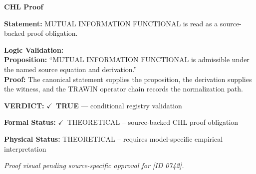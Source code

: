 \vspace{0.45em}
\noindent\textbf{CHL Proof}\par
\textbf{Statement:} MUTUAL INFORMATION FUNCTIONAL is read as a source-backed proof obligation.

\textbf{Logic Validation:}\\
\textbf{Proposition:} ``MUTUAL INFORMATION FUNCTIONAL is admissible under the named source equation and derivation.''\\
\textbf{Proof:} The canonical statement supplies the proposition, the derivation supplies the witness, and the TRAWIN operator chain records the normalization path.

\textbf{VERDICT:} \ensuremath{\checkmark}\ \textbf{TRUE} --- conditional registry validation

\textbf{Formal Status:} \ensuremath{\checkmark}\ THEORETICAL -- source-backed CHL proof obligation

\textbf{Physical Status:} THEORETICAL -- requires model-specific empirical interpretation
\par\vspace{0.45em}
\par
\vfill
\begingroup\footnotesize\itshape
Proof visual pending source-specific approval for [ID 0742].
\par\endgroup
\vfill
\endgroup
\endgroup
